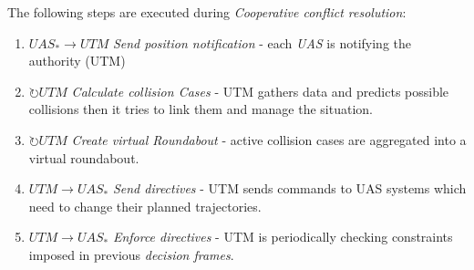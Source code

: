 \noindent The following steps are executed during \emph{Cooperative conflict resolution}:
\begin{enumerate}
    \item $UAS_* \to UTM$ \emph{Send position notification} - each \emph{UAS} is notifying the authority (UTM)
    
    \item $\circlearrowright UTM$ \emph{Calculate collision Cases} - UTM gathers data and predicts possible collisions then it tries to link them and manage the situation.
    
    \item $\circlearrowright UTM$ \emph{Create virtual Roundabout} - active collision cases are aggregated into a virtual roundabout. 
    
    \item $UTM \to UAS_*$ \emph{Send directives} - UTM sends commands to UAS systems which need to change their planned trajectories. 
    
    \item $UTM \to UAS_*$ \emph{Enforce directives} - UTM is periodically checking constraints imposed in previous \emph{decision frames}.
\end{enumerate}